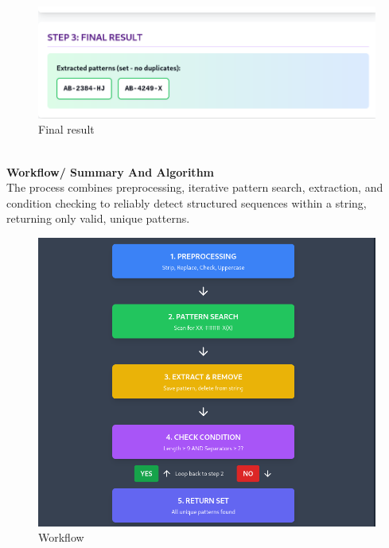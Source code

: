 \documentclass[12pt,a4paper]{article}
\begin{document}
\begin{figure}[H]
    \centering
    \includegraphics[width=\linewidth]{step3parsing.png}
    \caption{Final result}
    \label{fig:step1Parsing}
\end{figure}
\\

\textbf{Workflow/ Summary And Algorithm} \\
The process combines preprocessing, iterative pattern search, extraction, and condition checking to reliably detect structured sequences within a string, returning only valid, unique patterns.

\begin{figure}[h]
    \centering
    \includegraphics[width=\linewidth]{AIMS_Senegal__Assignment_template/summaryParsing.png}
    \caption{Workflow}
    \label{fig:step1Parsing}
\end{figure}
\end{document}
